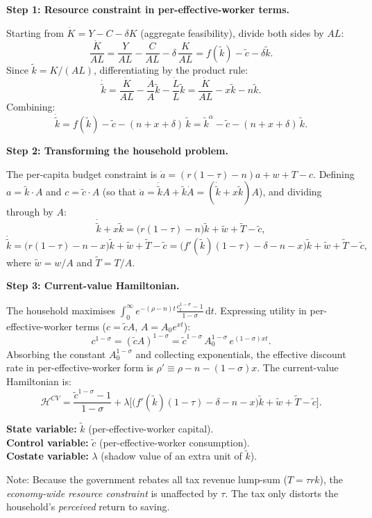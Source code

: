 \documentclass[a4paper,11pt]{article}
\newcommand{\ktilde}{\tilde{k}}
\newcommand{\ctilde}{\tilde{c}}
\newcommand{\dd}{\mathrm{d}}
\begin{document}
\begin{answerbox}
\textbf{Step 1: Resource constraint in per-effective-worker terms.}

Starting from $\dot{K} = Y - C - \delta K$ (aggregate feasibility), divide both sides by $AL$:
\[
    \frac{\dot{K}}{AL} = \frac{Y}{AL} - \frac{C}{AL} - \delta\,\frac{K}{AL}
    = f(\ktilde) - \ctilde - \delta\ktilde.
\]
Since $\ktilde = K/(AL)$, differentiating by the product rule:
\[
    \dot{\ktilde} = \frac{\dot{K}}{AL} - \frac{\dot{A}}{A}\ktilde - \frac{\dot{L}}{L}\ktilde
    = \frac{\dot{K}}{AL} - x\ktilde - n\ktilde.
\]
Combining:
\[
    \boxed{\dot{\ktilde} = f(\ktilde) - \ctilde - (n + x + \delta)\,\ktilde
    = \ktilde^{\alpha} - \ctilde - (n + x + \delta)\,\ktilde.}
\]

\textbf{Step 2: Transforming the household problem.}

The per-capita budget constraint is $\dot{a} = (r(1-\tau) - n)a + w + T - c$.  Defining
$a = \ktilde \cdot A$ and $c = \ctilde \cdot A$ (so that $\dot{a} = \dot{\ktilde}A + \ktilde\dot{A}
= (\dot{\ktilde} + x\ktilde)A$), and dividing through by $A$:
\[
    \dot{\ktilde} + x\ktilde
    = \bigl(r(1-\tau) - n\bigr)\ktilde + \tilde{w} + \tilde{T} - \ctilde,
\]
\[
    \dot{\ktilde}
    = \bigl(r(1-\tau) - n - x\bigr)\ktilde + \tilde{w} + \tilde{T} - \ctilde
    = \bigl(f'(\ktilde)(1-\tau) - \delta - n - x\bigr)\ktilde + \tilde{w} + \tilde{T} - \ctilde,
\]
where $\tilde{w} = w/A$ and $\tilde{T} = T/A$.

\textbf{Step 3: Current-value Hamiltonian.}

The household maximises $\int_0^{\infty}e^{-(\rho-n)t}
\frac{c_t^{1-\sigma}-1}{1-\sigma}\,\dd t$.  Expressing utility in per-effective-worker terms
($c = \ctilde A$, $A = A_0 e^{xt}$):
\[
    c^{1-\sigma} = (\ctilde A)^{1-\sigma} = \ctilde^{1-\sigma}\,A_0^{1-\sigma}\,e^{(1-\sigma)xt}.
\]
Absorbing the constant $A_0^{1-\sigma}$ and collecting exponentials, the effective discount
rate in per-effective-worker form is $\rho' \equiv \rho - n - (1-\sigma)x$.  The
current-value Hamiltonian is:
\[
    \mathcal{H}^{CV} = \frac{\ctilde^{1-\sigma} - 1}{1-\sigma}
    + \lambda\bigl[\bigl(f'(\ktilde)(1-\tau) - \delta - n - x\bigr)\ktilde
    + \tilde{w} + \tilde{T} - \ctilde\bigr].
\]

\textbf{State variable:} $\ktilde$ (per-effective-worker capital).\\
\textbf{Control variable:} $\ctilde$ (per-effective-worker consumption).\\
\textbf{Costate variable:} $\lambda$ (shadow value of an extra unit of $\ktilde$).

Note: Because the government rebates all tax revenue lump-sum ($T = \tau r k$), the
\emph{economy-wide resource constraint} is unaffected by $\tau$.  The tax only distorts
the household's \emph{perceived} return to saving.
\end{answerbox}
\end{document}
